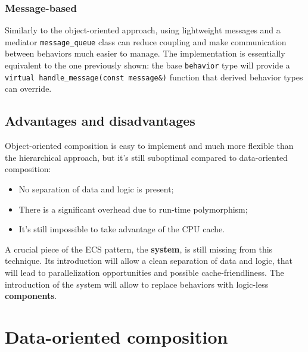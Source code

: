 \documentclass[twoside, 12pt, a4paper, openright]{book}
\begin{document}
\subsubsection{Message-based}\label{message-based-1}

Similarly to the object-oriented approach, using lightweight messages
and a mediator
\texttt{message_queue}
class can reduce coupling and make communication between behaviors much
easier to manage. The implementation is essentially equivalent to the
one previously shown: the base
\texttt{behavior}
type will provide a
\texttt{virtual handle_message(const message&)}
function that derived behavior types can override.

\subsection{Advantages and
disadvantages}\label{advantages-and-disadvantages-1}

Object-oriented composition is easy to implement and much more flexible
than the hierarchical approach, but it's still suboptimal compared to
data-oriented composition:

\begin{itemize}
\item
  No separation of data and logic is present;
\item
  There is a significant overhead due to run-time polymorphism;
\item
  It's still impossible to take advantage of the CPU cache.
\end{itemize}

A crucial piece of the ECS pattern, the \textbf{system}, is still
missing from this technique. Its introduction will allow a clean
separation of data and logic, that will lead to parallelization
opportunities and possible cache-friendliness. The introduction of the
system will allow to replace behaviors with logic-less
\textbf{components}.

\section{Data-oriented composition}\label{data-oriented-composition}
\end{document}
